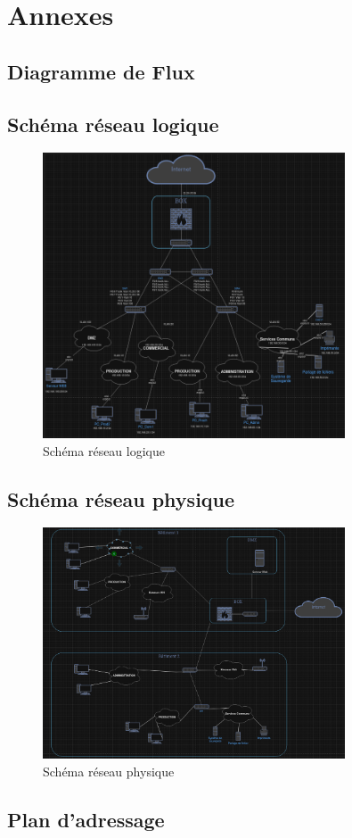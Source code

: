 \documentclass[a4paper,12pt]{report}
\begin{document}
    \chapter*{Annexes}
        \section{Diagramme de Flux}
        \section{Schéma réseau logique}
            \begin{figure}
                \centering
                \includegraphics[width=0.8\textwidth]{Images/Schema_logique.png}
                \caption{Schéma réseau logique}
            \end{figure}
        \section{Schéma réseau physique}
            \begin{figure}
                \centering
                \includegraphics[width=0.8\textwidth]{Images/Schema_physique.png}
                \caption{Schéma réseau physique}
            \end{figure}
        \section{Plan d'adressage}
        
\end{document}
